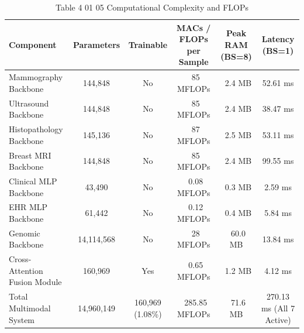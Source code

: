 \begin{table}[htbp]
\centering
\small
\begin{tabular}{lccccc}
\hline
Component & Parameters & Trainable & MACs / FLOPs per Sample & Peak RAM (BS=8) & Latency (BS=1) \\
\hline
Mammography Backbone & 144,848 & No & ~85 MFLOPs & ~2.4 MB & 52.61 ms \\
Ultrasound Backbone & 144,848 & No & ~85 MFLOPs & ~2.4 MB & 38.47 ms \\
Histopathology Backbone & 145,136 & No & ~87 MFLOPs & ~2.5 MB & 53.11 ms \\
Breast MRI Backbone & 144,848 & No & ~85 MFLOPs & ~2.4 MB & 99.55 ms \\
Clinical MLP Backbone & 43,490 & No & ~0.08 MFLOPs & ~0.3 MB & 2.59 ms \\
EHR MLP Backbone & 61,442 & No & ~0.12 MFLOPs & ~0.4 MB & 5.84 ms \\
Genomic Backbone & 14,114,568 & No & ~28 MFLOPs & ~60.0 MB & 13.84 ms \\
Cross-Attention Fusion Module & 160,969 & Yes & ~0.65 MFLOPs & ~1.2 MB & 4.12 ms \\
Total Multimodal System & 14,960,149 & 160,969 (1.08\%) & ~285.85 MFLOPs & ~71.6 MB & 270.13 ms (All 7 Active) \\
\hline
\end{tabular}
\caption{Table 4 01 05 Computational Complexity and FLOPs}
\label{tab:table_4_01_05_computational_complexity_and_flops}
\end{table}
